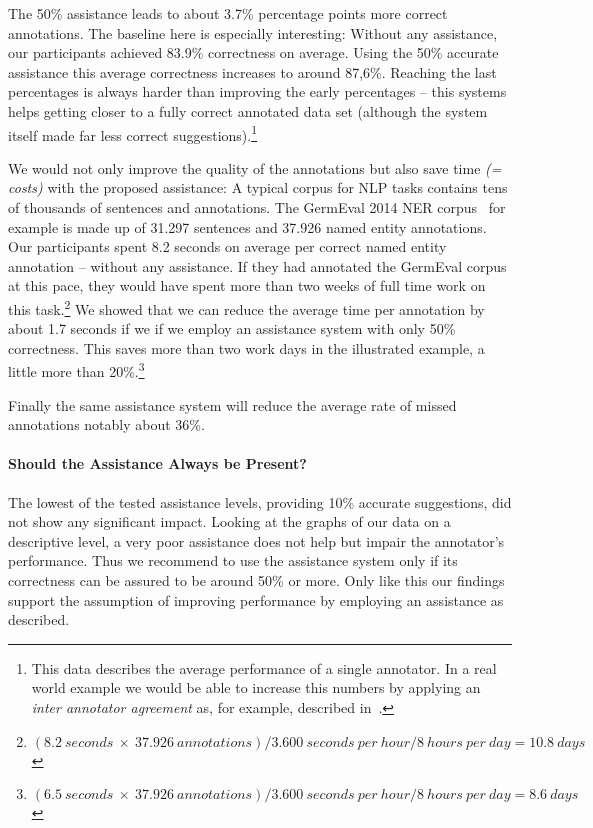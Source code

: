 		The 50\% assistance leads to about 3.7\% percentage points more correct annotations. The baseline here is especially interesting: Without any assistance, our participants achieved 83.9\% correctness on average. Using the 50\% accurate assistance this average correctness increases to around 87,6\%. Reaching the last percentages is always harder than improving the early percentages -- this systems helps getting closer to a fully correct annotated data set (although the system itself made far less correct suggestions).\footnote{This data describes the average performance of a single annotator. In a real world example we would be able to increase this numbers by applying an \textit{inter annotator agreement} as, for example, described in~\cite{brants2000inter}.}

		We would not only improve the quality of the annotations but also save time \textit{(= costs)} with the proposed assistance: A typical corpus for \ac{NLP} tasks contains tens of thousands of sentences and annotations. The GermEval 2014 \ac{NER} corpus~\cite{germEval2014ner} for example is made up of 31.297 sentences and 37.926 named entity annotations. Our participants spent 8.2 seconds on average per correct named entity annotation -- without any assistance. If they had annotated the GermEval corpus at this pace, they would have spent more than two weeks of full time work on this task.\footnote{\((8.2\ seconds\ \times\ 37.926\ annotations) / 3.600\ seconds\ per\ hour / 8\ hours\ per\ day = 10.8\ days\)}
		We showed that we can reduce the average time per annotation by about 1.7 seconds if we if we employ an assistance system with only 50\% correctness. This saves more than two work days in the illustrated example, a little more than 20\%.\footnote{\((6.5\ seconds\ \times\ 37.926\ annotations) / 3.600\ seconds\ per\ hour / 8\ hours\ per\ day = 8.6\ days\)}

		Finally the same assistance system will reduce the average rate of missed annotations notably about 36\%.

		\paragraph{Should the Assistance Always be Present?}
		The lowest of the tested assistance levels, providing 10\% accurate suggestions, did not show any significant impact. Looking at the graphs of our data on a descriptive level, a very poor assistance does not help but impair the annotator's performance. Thus we recommend to use the assistance system only if its correctness can be assured to be around 50\% or more. Only like this our findings support the assumption of improving performance by employing an assistance as described.

